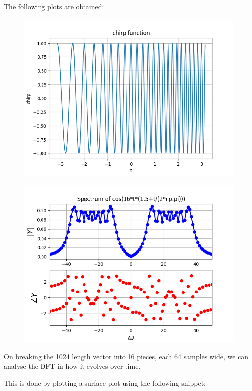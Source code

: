 \documentclass[11pt, a4paper]{article}
\begin{document}
The following plots are obtained:
\begin{figure}[H]
     \centering
     \includegraphics[scale=0.7]{Figure_12.png}
\end{figure}
\begin{figure}[H]
     \centering
     \includegraphics[scale=0.7]{Figure_8.png}
\end{figure}

On breaking the 1024 length vector into 16 pieces, each 64 samples wide,
we can analyse the DFT in how it evolves over time.

This is done by plotting a surface plot using the following snippet:
\end{document}
